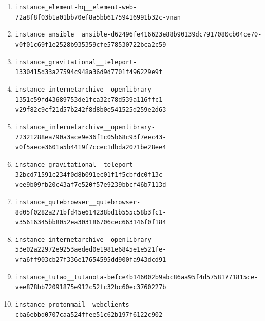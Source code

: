 \begin{enumerate}
\item \texttt{instance\_\allowbreak{}element-\allowbreak{}hq\_\allowbreak{}\_\allowbreak{}element-\allowbreak{}web-\allowbreak{}72a8f8f03b1a01\allowbreak{}bb70ef8a5bb617\allowbreak{}59416991b32c-\allowbreak{}vnan}
\item \texttt{instance\_\allowbreak{}ansible\_\allowbreak{}\_\allowbreak{}ansible-\allowbreak{}d62496fe416623\allowbreak{}e88b90139dc791\allowbreak{}7080cb04ce70-\allowbreak{}v0f01c69f1e252\allowbreak{}8b935359cfe578\allowbreak{}530722bca2c59}
\item \texttt{instance\_\allowbreak{}gravitational\_\allowbreak{}\_\allowbreak{}teleport-\allowbreak{}1330415d33a275\allowbreak{}94c948a36d9d77\allowbreak{}01f496229e9f}
\item \texttt{instance\_\allowbreak{}internetarchiv\allowbreak{}e\_\allowbreak{}\_\allowbreak{}openlibrary-\allowbreak{}1351c59fd43689\allowbreak{}753de1fca32c78\allowbreak{}d539a116ffc1-\allowbreak{}v29f82c9cf21d5\allowbreak{}7b242f8d8b0e54\allowbreak{}1525d259e2d63}
\item \texttt{instance\_\allowbreak{}internetarchiv\allowbreak{}e\_\allowbreak{}\_\allowbreak{}openlibrary-\allowbreak{}72321288ea790a\allowbreak{}3ace9e36f1c05b\allowbreak{}68c93f7eec43-\allowbreak{}v0f5aece3601a5\allowbreak{}b4419f7ccec1db\allowbreak{}da2071be28ee4}
\item \texttt{instance\_\allowbreak{}gravitational\_\allowbreak{}\_\allowbreak{}teleport-\allowbreak{}32bcd71591c234\allowbreak{}f0d8b091ec01f1\allowbreak{}f5cbfdc0f13c-\allowbreak{}vee9b09fb20c43\allowbreak{}af7e520f57e923\allowbreak{}9bbcf46b7113d}
\item \texttt{instance\_\allowbreak{}qutebrowser\_\allowbreak{}\_\allowbreak{}qutebrowser-\allowbreak{}8d05f0282a271b\allowbreak{}fd45e614238bd1\allowbreak{}b555c58b3fc1-\allowbreak{}v35616345bb805\allowbreak{}2ea303186706ce\allowbreak{}c663146f0f184}
\item \texttt{instance\_\allowbreak{}internetarchiv\allowbreak{}e\_\allowbreak{}\_\allowbreak{}openlibrary-\allowbreak{}53e02a22972e92\allowbreak{}53aeded0e1981e\allowbreak{}6845e1e521fe-\allowbreak{}vfa6ff903cb27f\allowbreak{}336e17654595dd\allowbreak{}900fa943dcd91}
\item \texttt{instance\_\allowbreak{}tutao\_\allowbreak{}\_\allowbreak{}tutanota-\allowbreak{}befce4b146002b\allowbreak{}9abc86aa95f4d5\allowbreak{}7581771815ce-\allowbreak{}vee878bb720918\allowbreak{}75e912c52fc32b\allowbreak{}c60ec3760227b}
\item \texttt{instance\_\allowbreak{}protonmail\_\allowbreak{}\_\allowbreak{}webclients-\allowbreak{}cba6ebbd0707ca\allowbreak{}a524ffee51c62b\allowbreak{}197f6122c902}

\end{enumerate}
